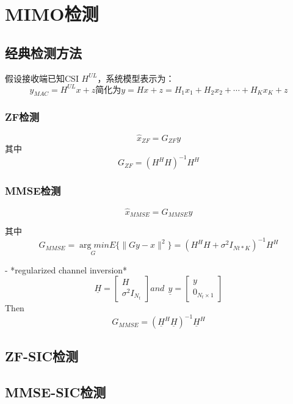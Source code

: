 \section{MIMO检测}
\subsection{经典检测方法}
假设接收端已知CSI $H^{UL}$，系统模型表示为：
\begin{equation}
y_{MAC}=H^{UL}x+z 简化为 y=Hx+z=H_1x_1+H_2x_2+\cdots+H_Kx_K+z
\end{equation}
\subsubsection{ZF检测}
\begin{equation}
    \hat{x}_{ZF}=G_{ZF}y
\end{equation}
其中
$$
G_{ZF}=(H^HH)^{-1}H^H
$$
\subsubsection{MMSE检测}

$$
\hat{x}_{MMSE}=G_{MMSE}y
$$

其中
$$
G_{MMSE}=\underset{G}{\arg min}E\{\|Gy-x\|^2\}=(H^HH+\sigma^2I_{Nt*K})^{-1}H^H
$$

- *regularized channel inversion*
$$
\underline{H}=\begin{bmatrix}
H \\
\sigma^2I_{N_t}
\end{bmatrix} and  \ \ 
\underline{y}=
\begin{bmatrix}
y \\
0_{N_t\times1}
\end{bmatrix}
$$
Then
$$
G_{MMSE}=(\underline{H}^H\underline{H})^{-1}\underline{H}^H
$$

\subsection{ZF-SIC检测}

\subsection{MMSE-SIC检测}

